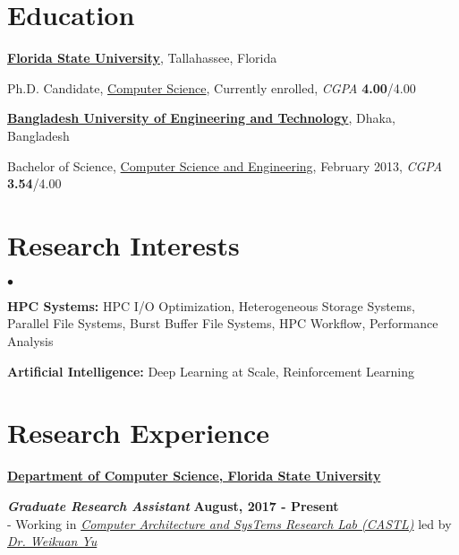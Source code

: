 \documentclass[margin,line]{res}
\newenvironment{list1}{
  \begin{list}{\ding{113}}{%
      \setlength{\itemsep}{0in}
      \setlength{\parsep}{0in} \setlength{\parskip}{0in}
      \setlength{\topsep}{0in} \setlength{\partopsep}{0in} 
      \setlength{\leftmargin}{0.17in}}}{\end{list}}
\newenvironment{list2}{
  \begin{list}{$\bullet$}{%
      \setlength{\itemsep}{0in}
      \setlength{\parsep}{0in} \setlength{\parskip}{0in}
      \setlength{\topsep}{0in} \setlength{\partopsep}{0in} 
      \setlength{\leftmargin}{0.2in}}}{\end{list}}
\begin{document}
\begin{resume}

\section{\sc Education}
{\bf \href{http://www.fsu.edu}{Florida State University}}, Tallahassee, Florida\\
\vspace*{-.15in}
\begin{list1}
\item[] Ph.D. Candidate, \href{http://www.cs.fsu.edu/}{Computer Science}, Currently enrolled, \textit{CGPA} \textbf{4.00}/4.00
\end{list1}
\vspace*{-.15in}
{\bf \href{http://buet.ac.bd}{Bangladesh University of Engineering and Technology}}, Dhaka, Bangladesh\\
\vspace*{-.15in}
\begin{list1}
\item[] Bachelor of Science, \href{http://cse.buet.ac.bd}{Computer Science and Engineering}, February 2013, \textit{CGPA} \textbf{3.54}/4.00
\end{list1}

\vspace*{-.1in}

\section{\sc Research Interests}
\begin{list2}
\item \textbf{HPC Systems:} HPC I/O Optimization, Heterogeneous Storage Systems, Parallel File Systems, Burst Buffer File Systems, HPC Workflow, Performance Analysis
\item \textbf{Artificial Intelligence:} Deep Learning at Scale, Reinforcement Learning
\end{list2}

\vspace*{-.1in}

\section{\sc Research Experience}
{\bf \href{http://www.cs.fsu.edu/}{Department of Computer Science, Florida State University}}

\vspace{-.4cm}
\textbf{{\em Graduate Research Assistant}} \hfill {\bf August, 2017 - Present}\\
- Working in \textit{\href{http://castl.cs.fsu.edu/doku.php/}{Computer Architecture and SysTems Research Lab (CASTL)}} led by \textit{\href{https://www.cs.fsu.edu/~yuw/}{Dr. Weikuan Yu}}


\end{resume}
\end{document}
